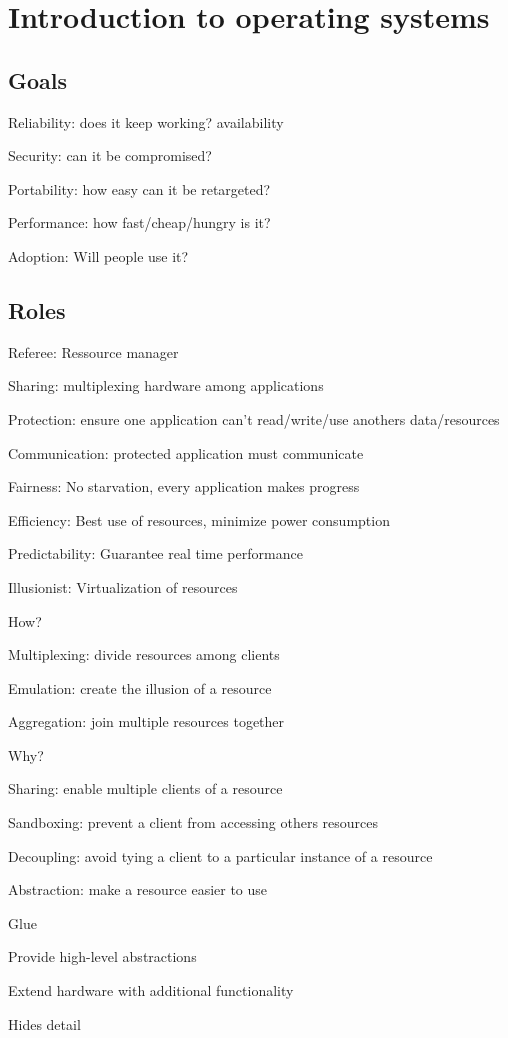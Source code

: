 \section{Introduction to operating systems}

\subsection{Goals}
\enumstart
	\item Reliability: does it keep working? \arrow availability
	\item Security: can it be compromised?
	\item Portability: how easy can it be retargeted?
	\item Performance: how fast/cheap/hungry is it?
	\item Adoption: Will people use it?
\enumend

\subsection{Roles}
\enumstart
	\item Referee: Ressource manager
	\enumstart
		\item Sharing: multiplexing hardware among applications
		\item Protection: ensure one application can't read/write/use anothers data/resources
		\item Communication: protected application must communicate
		\item Fairness: No starvation, every application makes progress
		\item Efficiency: Best use of resources, minimize power consumption
		\item Predictability: Guarantee real time performance
	\enumend
	\item Illusionist: Virtualization of resources
	\enumstart
		\item How?
		\enumstart
			\item Multiplexing: divide resources among clients
			\item Emulation: create the illusion of a resource
			\item Aggregation: join multiple resources together
		\enumend
		\item Why?
		\enumstart
			\item Sharing: enable multiple clients of a resource
			\item Sandboxing: prevent a client from accessing others resources
			\item Decoupling: avoid tying a client to a particular instance of a resource
			\item Abstraction: make a resource easier to use
		\enumend
	\enumend
	\item Glue
	\enumstart
		\item Provide high-level abstractions
		\item Extend hardware with additional functionality
		\item Hides detail
	\enumend
\enumend

